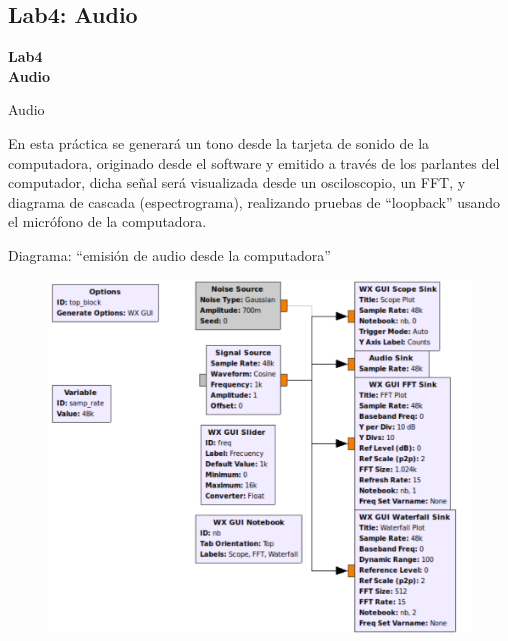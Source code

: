 \subsection{Lab4: Audio}
\begin{frame}{}


\bfseries{\textrm{\LARGE Lab4\\ \Large Audio}}
\raggedright
\end{frame}

\begin{frame}{Audio }



En esta práctica se generará un tono desde la tarjeta de sonido de la
computadora, originado desde el software y emitido a través de los parlantes
del computador, dicha señal será visualizada desde un osciloscopio, un FFT, y
diagrama de cascada (espectrograma), realizando pruebas de ``loopback'' usando el
micrófono de la computadora.

\end{frame}

\begin{frame}{Diagrama:  ``emisión de audio desde la computadora''}

\begin{figure}

\begin{center}
\vspace{-0.3cm}
\includegraphics[width=.7\textwidth]{parte1/lab4/pdf/lab4_1.pdf}
\end{center}
\end{figure}

\end{frame}

